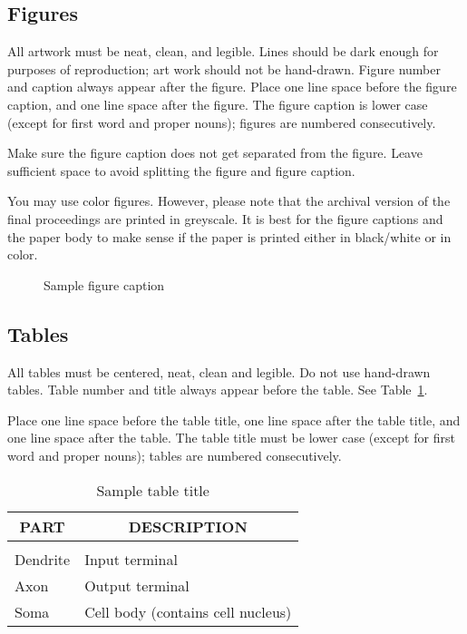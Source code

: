\documentclass{article}
\theoremstyle{plain}
\begin{document}
\subsection{Figures}

All artwork must be neat, clean, and legible. Lines should be dark enough for
purposes of reproduction; art work should not be hand-drawn. Figure number and
caption always appear after the figure. Place one line space before the figure
caption, and one line space after the figure. The figure caption is lower case
(except for first word and proper nouns); figures are numbered consecutively.

Make sure the figure caption does not get separated from the figure.
Leave sufficient space to avoid splitting the figure and figure caption.

You may use color figures. However, please note that the archival version
of the final proceedings are printed in greyscale. It is best for the
figure captions and the paper body to make sense if the paper is printed
either in black/white or in color.
\begin{figure}[h]
\begin{center}
\fbox{\rule[-.5cm]{0cm}{4cm} \rule[-.5cm]{4cm}{0cm}}
\end{center}
\caption{Sample figure caption}
\end{figure}

\subsection{Tables}

All tables must be centered, neat, clean and legible. Do not use hand-drawn
tables. Table number and title always appear before the table. See
Table~\ref{sample-table}.

Place one line space before the table title, one line space after the table
title, and one line space after the table. The table title must be lower case
(except for first word and proper nouns); tables are numbered consecutively.

\begin{table}[t]
\caption{Sample table title}
\label{sample-table}
\begin{center}
\begin{tabular}{ll}
\multicolumn{1}{c}{\bf PART}  &\multicolumn{1}{c}{\bf DESCRIPTION}
\\ \hline \\
Dendrite         &Input terminal \\
Axon             &Output terminal \\
Soma             &Cell body (contains cell nucleus) \\
\end{tabular}
\end{center}
\end{table}
\end{document}
